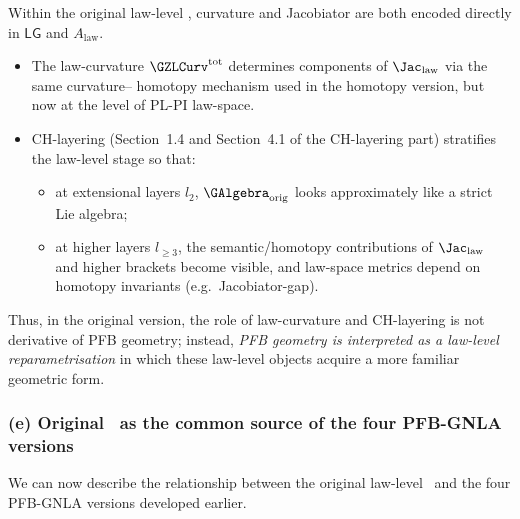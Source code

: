 \documentclass[11pt]{book}
\theoremstyle{plain}
\theoremstyle{definition}
\begin{document}
Within the original law-level \GAlgebra, curvature and Jacobiator are
both encoded directly in $\mathsf{LG}$ and $A_{\mathrm{law}}$.

\begin{itemize}
  \item The law-curvature $\GZLCurv^{\mathrm{tot}}$ determines
        components of $\Jac_{\mathrm{law}}$ via the same curvature–
        homotopy mechanism used in the homotopy version, but now at
        the level of PL-PI law-space.
  \item CH-layering (Section~1.4 and Section~4.1 of the CH-layering
        part) stratifies the law-level stage so that:
        \begin{itemize}
          \item at extensional layers $l_2$, $\GAlgebra_{\mathrm{orig}}$
                looks approximately like a strict Lie algebra;
          \item at higher layers $l_{\ge3}$, the semantic/homotopy
                contributions of $\Jac_{\mathrm{law}}$ and higher
                brackets become visible, and law-space metrics depend
                on homotopy invariants (e.g.\ Jacobiator-gap).
        \end{itemize}
\end{itemize}

Thus, in the original version, the role of law-curvature and CH-layering
is not derivative of PFB geometry; instead, \emph{PFB geometry is
interpreted as a law-level reparametrisation} in which these law-level
objects acquire a more familiar geometric form.



\subsubsection*{(e) Original \GAlgebra\ as the common source of the four PFB-GNLA versions}

We can now describe the relationship between the original law-level
\GAlgebra\ and the four PFB-GNLA versions developed earlier.
\end{document}
